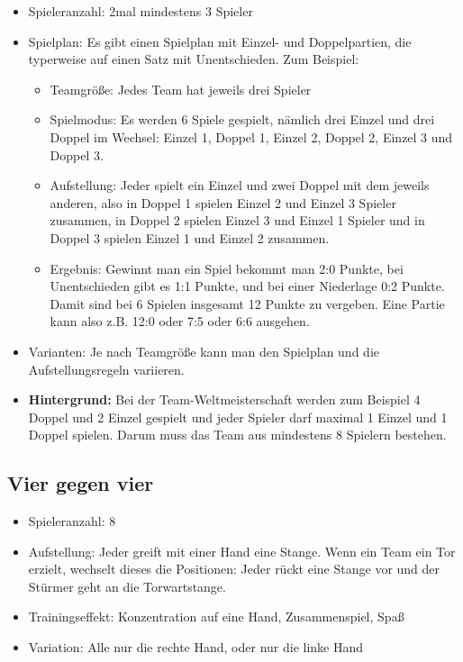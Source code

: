 \begin{itemize}
\item Spieleranzahl: 2mal mindestens 3 Spieler
\item Spielplan: Es gibt einen Spielplan mit Einzel- und Doppelpartien, die typerweise auf einen Satz mit Unentschieden. Zum Beispiel:
\begin{itemize}
\item Teamgröße: Jedes Team hat jeweils drei Spieler
\item Spielmodus: Es werden 6 Spiele gespielt, nämlich drei Einzel und drei Doppel im Wechsel: Einzel 1, Doppel 1, Einzel 2, Doppel 2, Einzel 3 und Doppel 3.
\item Aufstellung: Jeder spielt ein Einzel und zwei Doppel mit dem jeweils anderen, also in Doppel 1 spielen Einzel 2 und Einzel 3 Spieler zusammen, in Doppel 2 spielen Einzel 3 und Einzel 1 Spieler und in Doppel 3 spielen Einzel 1 und Einzel 2 zusammen.  
\item Ergebnis: Gewinnt man ein Spiel bekommt man 2:0 Punkte, bei Unentschieden gibt es 1:1 Punkte, und bei einer Niederlage 0:2 Punkte. Damit sind bei 6 Spielen insgesamt 12 Punkte zu vergeben. Eine Partie kann also z.B. 12:0 oder 7:5 oder 6:6 ausgehen. 
\end{itemize}
\item Varianten: Je nach Teamgröße kann man den Spielplan und die Aufstellungsregeln variieren. 
\item {\bf Hintergrund:} Bei der Team-Weltmeisterschaft werden zum Beispiel 4 Doppel und 2 Einzel gespielt und jeder Spieler darf maximal 1 Einzel und 1 Doppel spielen. Darum muss das Team aus mindestens 8 Spielern bestehen. 
\end{itemize}
 
\subsection{Vier gegen vier}
\label{spielformen:npersonen:viergegenvier}

\begin{itemize}
\item Spieleranzahl: 8
\item Aufstellung: Jeder greift mit einer Hand eine Stange.
Wenn ein Team ein Tor erzielt, wechselt dieses die Positionen: Jeder rückt
eine Stange vor und der Stürmer geht an die Torwartstange.
\item Trainingseffekt: Konzentration auf eine Hand, Zusammenspiel, Spaß
\item Variation: Alle nur die rechte Hand, oder nur die linke Hand
\end{itemize}

